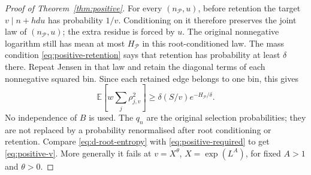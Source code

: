 \documentclass[11pt]{article}
\theoremstyle{definition}
\newcommand{\E}{\mathbb E}
\theoremstyle{remark}
\numberwithin{equation}{section}
\begin{document}
\begin{proof}[Proof of Theorem~\ref{thm:positive}]
For every $(n_{\mathcal P},u)$, before retention the target $v\mid n+hdu$ has probability $1/v$.
Conditioning on it therefore preserves the joint law of $(n_{\mathcal P},u)$; the extra residue is
forced by $u$. The original nonnegative logarithm still has mean at most $H_{\mathcal P}$ in this
root-conditioned law. The mass condition \eqref{eq:positive-retention} says that retention has
probability at least $\delta$ there. Repeat Jensen in that law and retain the diagonal terms of each
nonnegative squared bin. Since each retained edge belongs to one bin, this gives
\begin{equation}\label{eq:d-root-entropy}
 \E[w\sum_j\rho_{j,v}^2]\ge\delta(S/v)e^{-H_{\mathcal P}/\delta}.
\end{equation}
No independence of $B$ is used. The $q_n$ are the original selection probabilities; they are not
replaced by a probability renormalised after root conditioning or retention.
Compare \eqref{eq:d-root-entropy} with \eqref{eq:positive-required} to get
\eqref{eq:positive-v}. More generally it fails at $v=X^\theta$,
$X=\exp(L^A)$, for fixed $A>1$ and $\theta>0$.
\end{proof}
\end{document}
